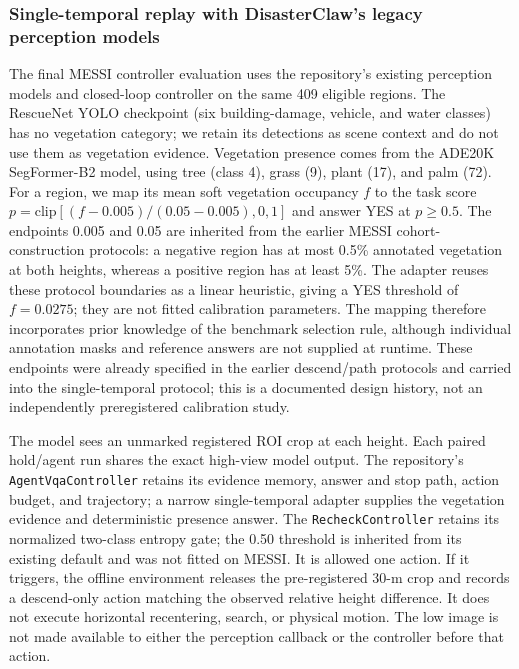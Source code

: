 \subsubsection{Single-temporal replay with DisasterClaw's legacy perception models}
\label{sec:messi-native-agent}
The final MESSI controller evaluation uses the repository's existing perception models and closed-loop controller on the same 409 eligible regions. The RescueNet YOLO checkpoint (six building-damage, vehicle, and water classes) has no vegetation category; we retain its detections as scene context and do not use them as vegetation evidence. Vegetation presence comes from the ADE20K SegFormer-B2 model, using tree (class 4), grass (9), plant (17), and palm (72). For a region, we map its mean soft vegetation occupancy $f$ to the task score $p=\mathrm{clip}[(f-0.005)/(0.05-0.005),0,1]$ and answer YES at $p\geq0.5$. The endpoints 0.005 and 0.05 are inherited from the earlier MESSI cohort-construction protocols: a negative region has at most 0.5\% annotated vegetation at both heights, whereas a positive region has at least 5\%. The adapter reuses these protocol boundaries as a linear heuristic, giving a YES threshold of $f=0.0275$; they are not fitted calibration parameters. The mapping therefore incorporates prior knowledge of the benchmark selection rule, although individual annotation masks and reference answers are not supplied at runtime. These endpoints were already specified in the earlier descend/path protocols and carried into the single-temporal protocol; this is a documented design history, not an independently preregistered calibration study.

The model sees an unmarked registered ROI crop at each height. Each paired hold/agent run shares the exact high-view model output. The repository's \texttt{AgentVqaController} retains its evidence memory, answer and stop path, action budget, and trajectory; a narrow single-temporal adapter supplies the vegetation evidence and deterministic presence answer. The \texttt{RecheckController} retains its normalized two-class entropy gate; the 0.50 threshold is inherited from its existing default and was not fitted on MESSI. It is allowed one action. If it triggers, the offline environment releases the pre-registered 30-m crop and records a descend-only action matching the observed relative height difference. It does not execute horizontal recentering, search, or physical motion. The low image is not made available to either the perception callback or the controller before that action.

